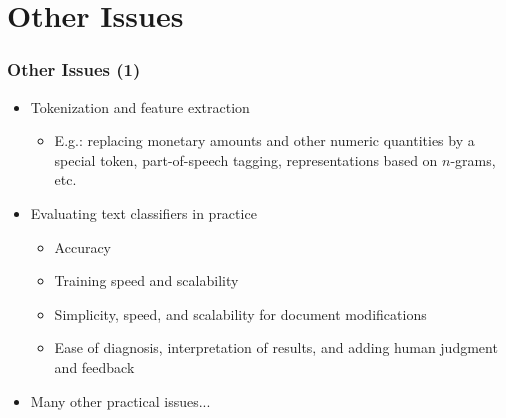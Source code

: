\documentclass{beamer}
\begin{document}


\section{Other Issues}

\begin{frame}
    \frametitle{Other Issues (1)}

    \begin{itemize}
    \item Tokenization and feature extraction
        \begin{itemize}
        \item E.g.: replacing monetary amounts and other numeric quantities by a special token, part-of-speech tagging, representations based on $n$-grams, etc.
        \end{itemize}
    
    \item Evaluating text classifiers in practice
     \begin{itemize}
     \item Accuracy
     \item Training speed and scalability
     \item Simplicity, speed, and scalability for document modifications
     \item Ease of diagnosis, interpretation of results, and adding human judgment and feedback
    \end{itemize}
  \end{itemize}
  \begin{itemize}
  \item Many other practical issues...
  \end{itemize}
\end{frame}


\end{document}
